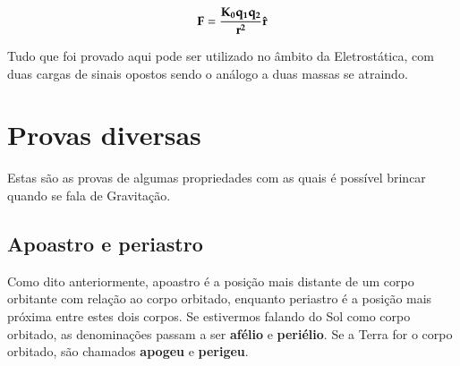 \[
	\bf{F} = \frac{K_0 q_1 q_2}{r^2}\hat{\bf{r}}
\]

Tudo que foi provado aqui pode ser utilizado no âmbito da Eletrostática, com duas cargas de sinais opostos sendo o análogo a duas massas se atraindo.

\section{Provas diversas}

Estas são as provas de algumas propriedades com as quais é possível brincar quando se fala de Gravitação.

\subsection{Apoastro e periastro}

Como dito anteriormente, apoastro é a posição mais distante de um corpo orbitante com relação ao corpo orbitado, enquanto periastro é a posição mais próxima entre estes dois corpos. Se estivermos falando do Sol como corpo orbitado, as denominações passam a ser \textbf{afélio} e \textbf{periélio}. Se a Terra for o corpo orbitado, são chamados \textbf{apogeu} e \textbf{perigeu}.

